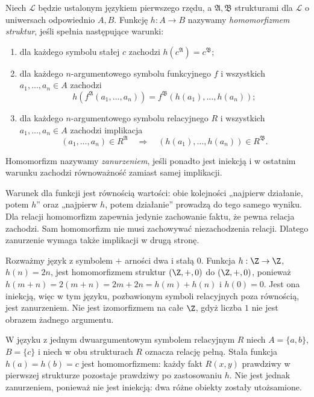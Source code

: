 \begin{definicja}\label{def:model-homomorphism}
Niech $\mathcal L$ będzie ustalonym językiem pierwszego rzędu,
a $\mathfrak A,\mathfrak B$ strukturami dla $\mathcal L$
o uniwersach odpowiednio $A,B$. Funkcję $h:A\to B$ nazywamy
\emph{homomorfizmem struktur}, jeśli spełnia następujące warunki:
\begin{enumerate}[label=(\roman*)]
\item dla każdego symbolu stałej $c$ zachodzi $h(c^{\mathfrak A})=c^{\mathfrak B}$;
\item dla każdego $n$-argumentowego symbolu funkcyjnego $f$ i wszystkich
$a_1,\ldots,a_n\in A$ zachodzi
\[
h(f^{\mathfrak A}(a_1,\ldots,a_n))
=f^{\mathfrak B}(h(a_1),\ldots,h(a_n));
\]
\item dla każdego $n$-argumentowego symbolu relacyjnego $R$
i wszystkich $a_1,\ldots,a_n\in A$ zachodzi implikacja
\[
(a_1,\ldots,a_n)\in R^{\mathfrak A}
\quad\Longrightarrow\quad
(h(a_1),\ldots,h(a_n))\in R^{\mathfrak B}.
\]
\end{enumerate}
Homomorfizm nazywamy \emph{zanurzeniem}, jeśli ponadto jest iniekcją
i w ostatnim warunku zachodzi równoważność zamiast samej implikacji.
\end{definicja}

\begin{uwaga}
Warunek dla funkcji jest równością wartości: obie kolejności
„najpierw działanie, potem $h$” oraz „najpierw $h$, potem działanie”
prowadzą do tego samego wyniku. Dla relacji homomorfizm zapewnia
jedynie zachowanie faktu, że pewna relacja zachodzi. Sam homomorfizm
nie musi zachowywać niezachodzenia relacji. Dlatego zanurzenie
wymaga także implikacji w drugą stronę.
\end{uwaga}

\begin{przyklad}
Rozważmy język z symbolem $+$ arności dwa i stałą $0$.
Funkcja $h:\Z\to\Z$, $h(n)=2n$, jest homomorfizmem
struktur $(\Z,+,0)$ do $(\Z,+,0)$, ponieważ
$h(m+n)=2(m+n)=2m+2n=h(m)+h(n)$ i $h(0)=0$.
Jest ona iniekcją, więc w tym języku, pozbawionym
symboli relacyjnych poza równością, jest zanurzeniem.
Nie jest izomorfizmem na całe $\Z$, gdyż liczba $1$
nie jest obrazem żadnego argumentu.
\end{przyklad}

\begin{przyklad}
W języku z jednym dwuargumentowym symbolem relacyjnym $R$ niech
$A=\{a,b\}$, $B=\{c\}$ i niech w obu strukturach
$R$ oznacza relację pełną. Stała funkcja $h(a)=h(b)=c$
jest homomorfizmem: każdy fakt $R(x,y)$ prawdziwy
w pierwszej strukturze pozostaje prawdziwy po zastosowaniu $h$.
Nie jest jednak zanurzeniem, ponieważ nie jest iniekcją:
dwa różne obiekty zostały utożsamione.
\end{przyklad}

